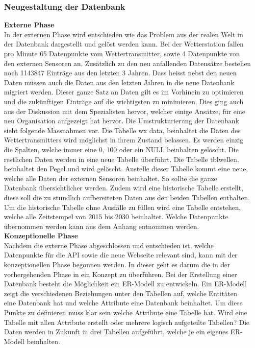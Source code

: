 \subsubsection{Neugestaltung der Datenbank}
\textbf{Externe Phase}\\
In der externen Phase wird entschieden wie das Problem aus der realen Welt in der Datenbank dargestellt und gelöst werden kann. Bei der Wetterstation fallen pro Minute 65 Datenpunkte vom Wettertransmitter, sowie 4 Datenpunkte von den externen Sensoren an. Zusätzlich zu den neu anfallenden Datensätze bestehen noch 1143847 Einträge aus den letzten 3 Jahren. Dass heisst nebst den neuen Daten müssen auch die Daten aus den letzten Jahren in die neue Datenbank migriert werden. Dieser ganze Satz an Daten gilt es im Vorhinein zu optimieren und die zukünftigen Einträge auf die wichtigsten zu minimieren. Dies ging auch aus der Diskussion mit dem Spezialisten hervor, welcher einige Ansätze, für eine neu Organisation aufgezeigt hat hervor. Die Umstrukturierung der Datenbank sieht folgende Massnahmen vor. Die Tabelle wx data, beinhaltet die Daten des Wettertransmitters wird möglichst in ihrem Zustand belassen. Es werden einzig die Spalten, welche immer eine 0, 100 oder ein NULL beinhalten gelöscht. Die restlichen Daten werden in eine neue Tabelle überführt. Die Tabelle tblwellen, beinhaltet den Pegel und wird gelöscht. Anstelle dieser Tabelle kommt eine neue, welche alle Daten der externen Sensoren beinhaltet. So sollte die ganze Datenbank übersichtlicher werden. Zudem wird eine historische Tabelle erstellt, diese soll die zu stündlich aufbereiteten Daten aus den beiden Tabellen enthalten. Um die historische Tabelle ohne Ausfälle zu füllen wird eine Tabelle entstehen, welche alle Zeitstempel von 2015 bis 2030 beinhaltet. Welche Datenpunkte übernommen werden kann aus dem Anhang  entnommen werden.\\

\textbf{Konzeptionelle Phase}\\
Nachdem die externe Phase abgeschlossen und entschieden ist, welche Datenpunkte für die API sowie die neue Webseite relevant sind, kann mit der konzeptionellen Phase begonnen werden. In dieser geht es darum die in der vorhergehenden Phase in ein Konzept zu überführen. Bei der Erstellung einer Datenbank besteht die Möglichkeit ein ER-Modell zu entwickeln. Ein ER-Modell zeigt die verschiedenen Beziehungen unter den Tabellen auf, welche Entitäten eine Datenbank hat und welche Attribute eine Datenbank beinhaltet.\cite{FrankGeisler2011mitpu} Um diese Punkte zu definieren muss klar sein welche Attribute eine Tabelle hat. Wird eine Tabelle mit allen Attribute erstellt oder mehrere logisch aufgeteilte Tabellen? Die Daten werden in Zukunft in drei Tabellen aufgeführt, welche je ein eigenes ER-Modell beinhalten.\\

